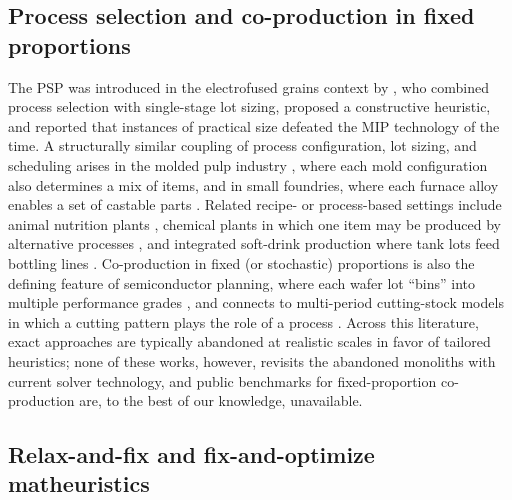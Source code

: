 \subsection{Process selection and co-production in fixed proportions}
\label{sec:rw-coproduction}

The PSP was introduced in the electrofused grains context by
\citet{luche2009combining}, who combined process selection with
single-stage lot sizing, proposed a constructive heuristic, and
reported that instances of practical size defeated the MIP technology
of the time. A structurally similar coupling of process configuration,
lot sizing, and scheduling arises in the molded pulp industry
\citep{martinez2018coupled}, where each mold configuration also
determines a mix of items, and in small foundries, where each furnace
alloy enables a set of castable parts \citep{araujo2008foundry}.
Related recipe- or process-based settings include animal nutrition
plants \citep{toso2009lot,clark2010production}, chemical plants in
which one item may be produced by alternative processes
\citep{villasboas2021chemical}, and integrated soft-drink production
where tank lots feed bottling lines
\citep{ferreira2009solution,toledo2015sitlsp}. Co-production in fixed
(or stochastic) proportions is also the defining feature of
semiconductor planning, where each wafer lot ``bins'' into multiple
performance grades \citep{leachman2002semiconductor,ng2007robust},
and connects to multi-period cutting-stock models in which a cutting
pattern plays the role of a process \citep{silva2023formulations}.
Across this literature, exact approaches are typically abandoned at
realistic scales in favor of tailored heuristics; none of these works,
however, revisits the abandoned monoliths with current solver
technology, and public benchmarks for fixed-proportion co-production
are, to the best of our knowledge, unavailable.

\subsection{Relax-and-fix and fix-and-optimize matheuristics}
\label{sec:rw-matheuristics}

